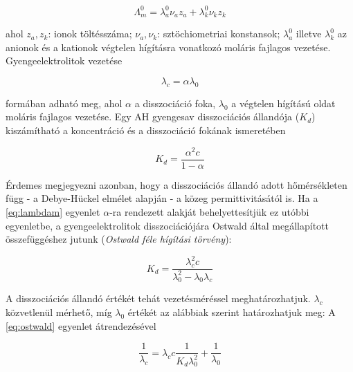 \begin{equation}
\label{eq:kohlrausch2}
	\Lambda _m^0
	=
	\lambda _a^0 \nu _a z_a + \lambda _k^0 \nu _k z_k
\end{equation}

ahol $z_a, z_k$: ionok töltésszáma; $\nu _a, \nu _k$: sztöchiometriai konstansok; $\lambda _a^0$ illetve $\lambda _k^0$ az anionok és a kationok végtelen hígításra vonatkozó moláris fajlagos vezetése.
Gyengeelektrolitok vezetése

\begin{equation}
\label{eq:lambdam}
        \lambda_c
        =
        \alpha
	\lambda_0
\end{equation}

formában adható meg, ahol $\alpha$ a disszociáció foka, $\lambda _0$ a végtelen hígítású oldat moláris fajlagos vezetése.
Egy AH gyengesav disszociációs állandója ($K_d$) kiszámítható a koncentráció és a disszociáció fokának ismeretében

\begin{equation}
\label{eq:kd}
        K_d
        =
        \frac{\alpha^2 c}{1-\alpha}
\end{equation}

Érdemes megjegyezni azonban, hogy a disszociációs állandó adott hőmérsékleten függ - a Debye-Hückel elmélet alapján - a közeg permittivitásától is.
Ha a \ref{eq:lambdam} egyenlet $\alpha$-ra rendezett alakját behelyettesítjük ez utóbbi egyenletbe, a gyengeelektrolitok disszociációjára Ostwald által megállapított összefüggéshez jutunk (\emph{Ostwald féle hígítási törvény}):

\begin{equation}
\label{eq:ostwald}
        K_d
        =
        \frac{\lambda_c^2 c}{\lambda_0^2 - \lambda_0\lambda_c}
\end{equation}

A disszociációs állandó értékét tehát vezetésméréssel meghatározhatjuk. 
$\lambda_c$ közvetlenül mérhető, míg $\lambda_0$ értékét az alábbiak szerint határozhatjuk meg:
A \ref{eq:ostwald} egyenlet átrendezésével

\begin{equation}
\label{eq:ostwald2}
        \frac{1}{\lambda_c}
        =
	\lambda_c
	c
	\frac{1}{K_d \lambda_0^2}
	+\frac{1}{\lambda_0}
\end{equation}

